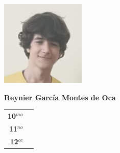 \begin{minipage}{0.2\textwidth}
	\includegraphics[width=\linewidth]{img/concursantes/reynier.png} %
\end{minipage}
\hfill
\begin{minipage}{0.7\textwidth}
	\textbf{Reynier García Montes de Oca}
	
	\vspace*{0.1in}
	\begin{tabular}{rl}
		
		\textbf{10$^{mo}$} &   \\
		
		\textbf{11$^{no}$} &  \\
		
		\textbf{12$^{ce}$} &   \\
		
		
	\end{tabular}
\end{minipage}

